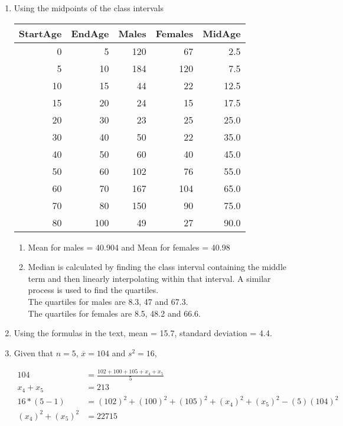 \begin{enumerate}
	\item Using the midpoints of the class intervals
	\begin{table}[H]
		\centering
		\begin{tabular}{rrrrr}
			\toprule
			StartAge &  EndAge &  Males &  Females &  MidAge \\
			\midrule
			0 &       5 &    120 &       67 &     2.5 \\
			5 &      10 &    184 &      120 &     7.5 \\
			10 &      15 &     44 &       22 &    12.5 \\
			15 &      20 &     24 &       15 &    17.5 \\
			20 &      30 &     23 &       25 &    25.0 \\
			30 &      40 &     50 &       22 &    35.0 \\
			40 &      50 &     60 &       40 &    45.0 \\
			50 &      60 &    102 &       76 &    55.0 \\
			60 &      70 &    167 &      104 &    65.0 \\
			70 &      80 &    150 &       90 &    75.0 \\
			80 &     100 &     49 &       27 &    90.0 \\
			\bottomrule
		\end{tabular}
	\end{table}
	
	\begin{enumerate}
		\item Mean for males = 40.904  and Mean for females = 40.98\\
		\item Median is calculated by finding the class interval containing the middle term and then linearly interpolating within that interval. A similar process is used to find the quartiles. \\
		
		The quartiles for males are 8.3, 47 and 67.3. \\
		The quartiles for females are 8.5, 48.2 and 66.6.
	\end{enumerate}
	
	\item Using the formulas in the text, mean =  15.7, standard deviation = 4.4.
	
	\item Given that $ n = 5 $, $ \overline{x} = 104 $ and $ s^2 = 16 $, 
	
	
		\begin{align}
			104 &= \frac{ 102 + 100 + 105 + x_{4} + x_{5} }{5} \\
			x_4 + x_5 &= 213 \\
			16 * (5 - 1) &= (102)^2 + (100)^2 + (105)^2 + (x_4)^2 + (x_5)^2  - (5)(104)^2 \\
			(x_4)^2 + (x_5)^2 &= 22715
		\end{align}
		

\end{enumerate}
